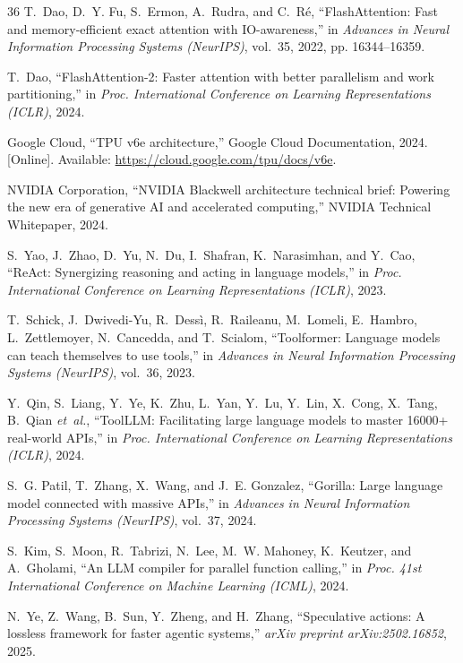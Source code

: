 \documentclass[10pt,conference]{IEEEtran}
\begin{document}
\begin{thebibliography}{36}
T.~Dao, D.~Y. Fu, S.~Ermon, A.~Rudra, and C.~R{\'e}, ``{FlashAttention}: Fast and memory-efficient exact attention with {IO}-awareness,'' in \emph{Advances in Neural Information Processing Systems (NeurIPS)}, vol.~35, 2022, pp. 16344--16359.

T.~Dao, ``{FlashAttention-2}: Faster attention with better parallelism and work partitioning,'' in \emph{Proc. International Conference on Learning Representations (ICLR)}, 2024.

{Google Cloud}, ``{TPU v6e} architecture,'' Google Cloud Documentation, 2024. [Online]. Available: \url{https://cloud.google.com/tpu/docs/v6e}.

{NVIDIA Corporation}, ``{NVIDIA Blackwell} architecture technical brief: Powering the new era of generative {AI} and accelerated computing,'' NVIDIA Technical Whitepaper, 2024.

S.~Yao, J.~Zhao, D.~Yu, N.~Du, I.~Shafran, K.~Narasimhan, and Y.~Cao, ``{ReAct}: Synergizing reasoning and acting in language models,'' in \emph{Proc. International Conference on Learning Representations (ICLR)}, 2023.

T.~Schick, J.~Dwivedi-Yu, R.~Dess{\`i}, R.~Raileanu, M.~Lomeli, E.~Hambro, L.~Zettlemoyer, N.~Cancedda, and T.~Scialom, ``Toolformer: Language models can teach themselves to use tools,'' in \emph{Advances in Neural Information Processing Systems (NeurIPS)}, vol.~36, 2023.

Y.~Qin, S.~Liang, Y.~Ye, K.~Zhu, L.~Yan, Y.~Lu, Y.~Lin, X.~Cong, X.~Tang, B.~Qian \emph{et~al.}, ``{ToolLLM}: Facilitating large language models to master 16000+ real-world {APIs},'' in \emph{Proc. International Conference on Learning Representations (ICLR)}, 2024.

S.~G. Patil, T.~Zhang, X.~Wang, and J.~E. Gonzalez, ``Gorilla: Large language model connected with massive {APIs},'' in \emph{Advances in Neural Information Processing Systems (NeurIPS)}, vol.~37, 2024.

S.~Kim, S.~Moon, R.~Tabrizi, N.~Lee, M.~W. Mahoney, K.~Keutzer, and A.~Gholami, ``An {LLM} compiler for parallel function calling,'' in \emph{Proc. 41st International Conference on Machine Learning (ICML)}, 2024.

N.~Ye, Z.~Wang, B.~Sun, Y.~Zheng, and H.~Zhang, ``Speculative actions: A lossless framework for faster agentic systems,'' \emph{arXiv preprint arXiv:2502.16852}, 2025.


\end{thebibliography}
\end{document}
